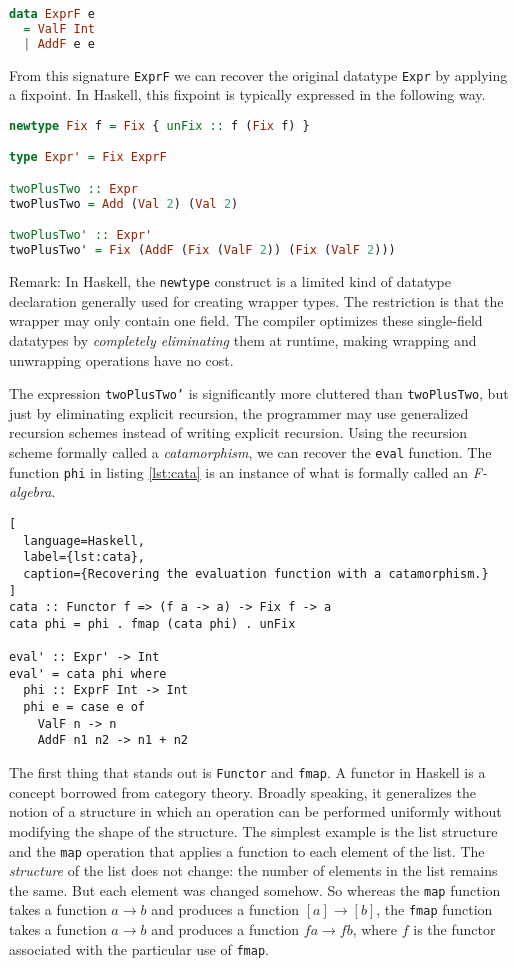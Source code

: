 \documentclass[letterpaper,11pt]{article}
\newcommand{\codesnip}{\texttt}
\begin{document}
\begin{lstlisting}[language=Haskell]
data ExprF e
  = ValF Int
  | AddF e e
\end{lstlisting}

From this signature \codesnip{ExprF} we can recover the original datatype
\codesnip{Expr} by applying a fixpoint. In Haskell, this fixpoint is typically
expressed in the following way.

\begin{lstlisting}[language=Haskell]
newtype Fix f = Fix { unFix :: f (Fix f) }

type Expr' = Fix ExprF

twoPlusTwo :: Expr
twoPlusTwo = Add (Val 2) (Val 2)

twoPlusTwo' :: Expr'
twoPlusTwo' = Fix (AddF (Fix (ValF 2)) (Fix (ValF 2)))
\end{lstlisting}

Remark: In Haskell, the \codesnip{newtype} construct is a limited kind of
datatype declaration generally used for creating wrapper types. The restriction
is that the wrapper may only contain one field. The compiler optimizes these
single-field datatypes by \emph{completely eliminating} them at runtime, making
wrapping and unwrapping operations have no cost.

The expression \codesnip{twoPlusTwo'} is significantly more cluttered than
\codesnip{twoPlusTwo}, but just by eliminating explicit recursion, the
programmer may use generalized recursion schemes\cite{RecursionSchemes} instead
of writing explicit recursion. Using the recursion scheme formally called a
\emph{catamorphism}, we can recover the \codesnip{eval} function. The function
\codesnip{phi} in listing \ref{lst:cata} is an instance of what is formally
called an \emph{F-algebra}.

\begin{lstlisting}[
  language=Haskell,
  label={lst:cata},
  caption={Recovering the evaluation function with a catamorphism.}
]
cata :: Functor f => (f a -> a) -> Fix f -> a
cata phi = phi . fmap (cata phi) . unFix

eval' :: Expr' -> Int
eval' = cata phi where
  phi :: ExprF Int -> Int
  phi e = case e of
    ValF n -> n
    AddF n1 n2 -> n1 + n2
\end{lstlisting}

The first thing that stands out is \codesnip{Functor} and \codesnip{fmap}.
A functor in Haskell is a concept borrowed from category theory. Broadly
speaking, it generalizes the notion of a structure in which an operation can be
performed uniformly without modifying the shape of the structure. The simplest
example is the list structure and the \codesnip{map} operation that applies a
function to each element of the list. The \emph{structure} of the list does not
change: the number of elements in the list remains the same. But each element
was changed somehow.  So whereas the \codesnip{map} function takes a function
$a \to b$ and produces a function $[a] \to [b]$, the \codesnip{fmap} function
takes a function $a \to b$ and produces a function $f a \to f b$, where $f$ is
the functor associated with the particular use of \codesnip{fmap}.
\end{document}
